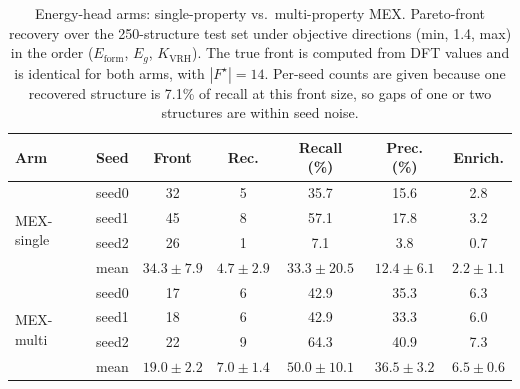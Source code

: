 \begin{table}[htbp]
\renewcommand{\arraystretch}{1.2}
\setlength{\tabcolsep}{4pt}
\caption{Energy-head arms: single-property vs.\ multi-property MEX. Pareto-front recovery over the 250-structure test set under objective directions (min, 1.4, max) in the order ($E_\mathrm{form}$, $E_g$, $K_\mathrm{VRH}$). The true front is computed from DFT values and is identical for both arms, with $|F^\star|{=}14$. Per-seed counts are given because one recovered structure is 7.1\% of recall at this front size, so gaps of one or two structures are within seed noise.}
\label{tab:pareto_arms_mex}
\centering
\footnotesize
\begin{tabular}{@{}llccccc@{}}
\hline\hline
\textbf{Arm} & \textbf{Seed} & \textbf{Front} & \textbf{Rec.} & \textbf{Recall (\%)} & \textbf{Prec. (\%)} & \textbf{Enrich.} \\
\hline
\multirow{4}{*}{MEX-single}
  & seed0 & 32 & 5 & 35.7 & 15.6 & 2.8 \\
  & seed1 & 45 & 8 & 57.1 & 17.8 & 3.2 \\
  & seed2 & 26 & 1 & 7.1 & 3.8 & 0.7 \\
  & mean & $34.3 \pm 7.9$ & $4.7 \pm 2.9$ & $33.3 \pm 20.5$ & $12.4 \pm 6.1$ & $2.2 \pm 1.1$ \\
\hline
\multirow{4}{*}{MEX-multi}
  & seed0 & 17 & 6 & 42.9 & 35.3 & 6.3 \\
  & seed1 & 18 & 6 & 42.9 & 33.3 & 6.0 \\
  & seed2 & 22 & 9 & 64.3 & 40.9 & 7.3 \\
  & mean & $19.0 \pm 2.2$ & $7.0 \pm 1.4$ & $50.0 \pm 10.1$ & $36.5 \pm 3.2$ & $6.5 \pm 0.6$ \\
\hline\hline
\end{tabular}
\end{table}
